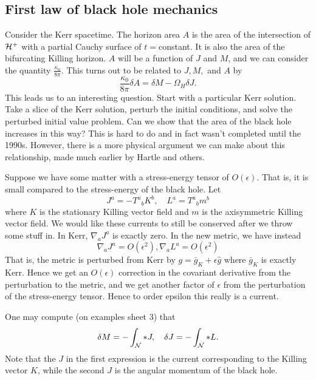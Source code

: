 \subsection*{First law of black hole mechanics}
Consider the Kerr spacetime. The horizon area $A$ is the area of the intersection of $\mathcal H^+$ with a partial Cauchy surface of $t={}$constant. It is also the area of the bifurcating Killing horizon. $A$ will be a function of $J$ and $M$, and we can consider the quantity $\frac{\kappa_0}{8\pi}$. This turns out to be related to $J,M,$ and $A$ by
\begin{equation}
    \frac{\kappa_0}{8\pi}\delta A = \delta M -\Omega_H \delta J.
\end{equation}
This leads us to an interesting question. Start with a particular Kerr solution. Take a slice of the Kerr solution, perturb the initial conditions, and solve the perturbed initial value problem. Can we show that the area of the black hole increases in this way? This is hard to do and in fact wasn't completed until the 1990s.%
However, there is a more physical argument we can make about this relationship, made much earlier by Hartle and others.

Suppose we have some matter with a stress-energy tensor of $O(\epsilon)$. That is, it is small compared to the stress-energy of the black hole. Let
\begin{equation}
    J^a = -T^a{}_b K^b,\quad L^a = T^a{}_b m^b
\end{equation}
where $K$ is the stationary Killing vector field and $m$ is the axisymmetric Killing vector field. We would like these currents to still be conserved after we throw some stuff in. In Kerr, $\nabla_a J^a$ is exactly zero. In the new metric, we have instead
\begin{equation}
    \nabla_a J^a = O(\epsilon^2), \nabla_a L^a = O(\epsilon^2)
\end{equation}
That is, the metric is perturbed from Kerr by $g=\bar g_K +\epsilon \hat g$ where $\bar g_K$ is exactly Kerr. Hence we get an $O(\epsilon)$ correction in the covariant derivative from the perturbation to the metric, and we get another factor of $\epsilon$ from the perturbation of the stress-energy tensor. Hence to order epsilon this really is a current.

One may compute (on examples sheet 3) that
\begin{equation}
    \delta M =-\int_\mathcal N * J, \quad \delta J = -\int_\mathcal N * L.
\end{equation}
Note that the $J$ in the first expression is the current corresponding to the Killing vector $K$, while the second $J$ is the angular momentum of the black hole.

